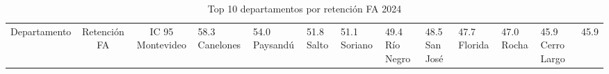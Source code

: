 \begin{table}
\caption{Top 10 departamentos por retención FA 2024}
\label{tab:fa_retention_top10}
\begin{tabular}{lcc}
\toprule
Departamento & Retención FA & IC 95%
\midrule
Montevideo & 58.3%
Canelones & 54.0%
Paysandú & 51.8%
Salto & 51.1%
Soriano & 49.4%
Río Negro & 48.5%
San José & 47.7%
Florida & 47.0%
Rocha & 45.9%
Cerro Largo & 45.9%
\bottomrule
\end{tabular}
\end{table}
